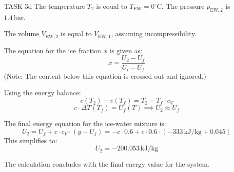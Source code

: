TASK 3d  
The temperature \( T_2 \) is equal to \( T_{\text{EW}} = 0^\circ\text{C} \). The pressure \( p_{\text{EW},2} \) is \( 1.4 \, \text{bar} \).  

The volume \( V_{\text{EW},2} \) is equal to \( V_{\text{EW},1} \), assuming incompressibility.  

The equation for the ice fraction \( x \) is given as:  
\[
x = \frac{U_2 - U_f}{U_i - U_f}
\]  
(Note: The content below this equation is crossed out and ignored.)  

Using the energy balance:  
\[
c(T_2) - c(T_f) = T_2 - T_f \cdot c_V
\]  
\[
c \cdot \Delta T(T_f) = U_f(T) \implies U_2 \approx U_f
\]  

The final energy equation for the ice-water mixture is:  
\[
U_2 = U_f + c \cdot c_V \cdot (y - U_f) = -c \cdot 0.6 + c \cdot 0.6 \cdot (-333 \, \text{kJ/kg} + 0.045)
\]  
This simplifies to:  
\[
U_2 = -200.053 \, \text{kJ/kg}
\]  

The calculation concludes with the final energy value for the system.